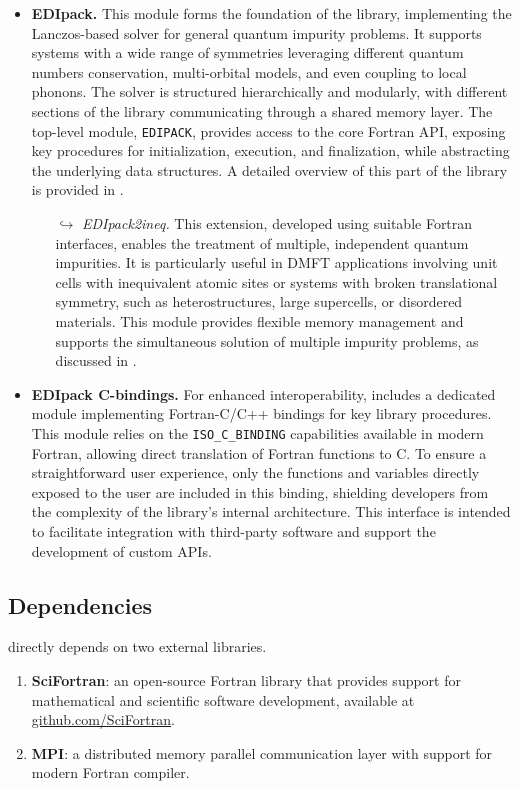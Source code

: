 \documentclass[edipack_sp.tex]{subfiles}
\begin{document}
\begin{itemize}
\item{\bf EDIpack.}
  This module forms the foundation of the library, implementing the 
  Lanczos-based solver for general quantum impurity problems. It 
  supports systems with a wide range of symmetries leveraging different quantum numbers conservation, multi-orbital models, and even coupling to local 
  phonons. The \NAME solver is structured hierarchically and modularly, 
  with different sections of the library communicating through a shared 
  memory layer. The top-level module, {\tt EDIPACK}, provides access 
  to the core Fortran API, exposing key procedures for initialization, 
  execution, and finalization, while abstracting the underlying data 
  structures. A detailed overview of this part of the library is 
  provided in .
  \begin{itemize}
    \item[$\hookrightarrow$]
    {\it EDIpack2ineq.}
  This extension, developed using suitable Fortran interfaces,
  enables the treatment of multiple, independent quantum 
impurities. It is particularly useful in DMFT applications involving 
unit cells with inequivalent atomic sites or systems with broken 
translational symmetry, such as heterostructures, large supercells, 
or disordered materials. This module provides flexible memory 
management and supports the simultaneous solution of multiple impurity 
problems, as discussed in .
\end{itemize}


\item{\bf EDIpack C-bindings.}
  For enhanced interoperability, \NAME includes a dedicated module 
implementing Fortran-C/C++ bindings for key library procedures. This 
module relies on the {\tt ISO\_C\_BINDING} capabilities available in 
modern Fortran, allowing direct translation of Fortran functions to C. 
To ensure a straightforward user experience, only the functions and 
variables directly exposed to the user are included in this binding, 
shielding developers from the complexity of the library's internal 
architecture. This interface is intended to facilitate integration 
with third-party software and support the development of custom APIs.
\end{itemize}




\subsection{Dependencies}\label{sSecInstallDependencies}
\NAME directly depends on two external libraries.
\begin{enumerate}
\item {\bf SciFortran}: an open-source Fortran library that provides support
for mathematical and scientific software development, available at \href{https://github.com/SciFortran/SciFortran}{github.com/SciFortran}.
\item {\bf MPI}: a distributed memory parallel communication layer with support for modern Fortran compiler.
\end{enumerate}
 
\end{document}
